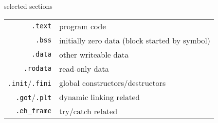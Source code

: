 \begin{frame}{selected sections}
\begin{tabular}{rl}
    {\tt .text} & program code \\
    {\tt .bss} & initially zero data {\scriptsize (block started by symbol)} \\
    {\tt .data} & other writeable data  \\
    {\tt .rodata} & read-only data \\
    {\tt .init}/{\tt .fini} & global constructors/destructors \\
    {\tt .got}/{\tt .plt} & dynamic linking related \\
    {\tt .eh\_frame} & try/catch related \\
\end{tabular}
\end{frame}


